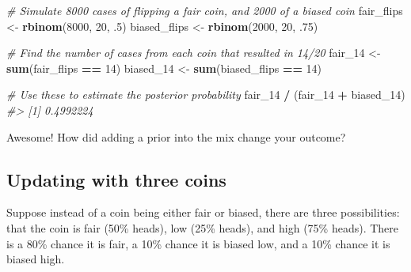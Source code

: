 \documentclass[]{article}
\newenvironment{Shaded}{\begin{snugshade}}{\end{snugshade}}
\newcommand{\CommentTok}[1]{\textcolor[rgb]{0.56,0.35,0.01}{\textit{#1}}}
\newcommand{\DecValTok}[1]{\textcolor[rgb]{0.00,0.00,0.81}{#1}}
\newcommand{\FloatTok}[1]{\textcolor[rgb]{0.00,0.00,0.81}{#1}}
\newcommand{\KeywordTok}[1]{\textcolor[rgb]{0.13,0.29,0.53}{\textbf{#1}}}
\newcommand{\NormalTok}[1]{#1}
\newcommand{\OperatorTok}[1]{\textcolor[rgb]{0.81,0.36,0.00}{\textbf{#1}}}
\newcommand{\StringTok}[1]{\textcolor[rgb]{0.31,0.60,0.02}{#1}}
\begin{document}
\begin{Shaded}
\begin{Highlighting}[]
\CommentTok{# Simulate 8000 cases of flipping a fair coin, and 2000 of a biased coin}
\NormalTok{fair_flips <-}\StringTok{ }\KeywordTok{rbinom}\NormalTok{(}\DecValTok{8000}\NormalTok{, }\DecValTok{20}\NormalTok{, }\FloatTok{.5}\NormalTok{)}
\NormalTok{biased_flips <-}\StringTok{ }\KeywordTok{rbinom}\NormalTok{(}\DecValTok{2000}\NormalTok{, }\DecValTok{20}\NormalTok{, }\FloatTok{.75}\NormalTok{)}

\CommentTok{# Find the number of cases from each coin that resulted in 14/20}
\NormalTok{fair_}\DecValTok{14}\NormalTok{ <-}\StringTok{ }\KeywordTok{sum}\NormalTok{(fair_flips }\OperatorTok{==}\StringTok{ }\DecValTok{14}\NormalTok{)}
\NormalTok{biased_}\DecValTok{14}\NormalTok{ <-}\StringTok{ }\KeywordTok{sum}\NormalTok{(biased_flips }\OperatorTok{==}\StringTok{ }\DecValTok{14}\NormalTok{)}

\CommentTok{# Use these to estimate the posterior probability}
\NormalTok{fair_}\DecValTok{14} \OperatorTok{/}\StringTok{ }\NormalTok{(fair_}\DecValTok{14} \OperatorTok{+}\StringTok{ }\NormalTok{biased_}\DecValTok{14}\NormalTok{)}
\CommentTok{#> [1] 0.4992224}
\end{Highlighting}
\end{Shaded}

Awesome! How did adding a prior into the mix change your outcome?

\hypertarget{updating-with-three-coins}{%
\subsection{Updating with three coins}\label{updating-with-three-coins}}

Suppose instead of a coin being either fair or biased, there are three
possibilities: that the coin is fair (50\% heads), low (25\% heads), and
high (75\% heads). There is a 80\% chance it is fair, a 10\% chance it
is biased low, and a 10\% chance it is biased high.
\end{document}
